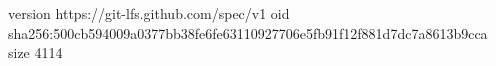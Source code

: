 version https://git-lfs.github.com/spec/v1
oid sha256:500cb594009a0377bb38fe6fe63110927706e5fb91f12f881d7dc7a8613b9cca
size 4114
